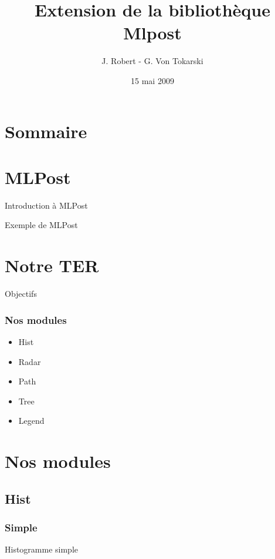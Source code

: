 \documentclass{beamer}
\title{Extension de la bibliothèque Mlpost}
\author{J. Robert - G. Von Tokarski}
\date{15 mai 2009}
\begin{document}
\begin{frame}
  \maketitle
\end{frame}

\section*{Sommaire}
\begin{frame}
  \tableofcontents
\end{frame}

\section{MLPost}
\begin{frame}{Introduction à MLPost}
\end{frame}

\begin{frame}{Exemple de MLPost}
\end{frame}

\section{Notre TER}
\begin{frame}{Objectifs}
\end{frame}

\begin{frame}
  \frametitle{Nos modules}
  \begin{itemize}
    \item<1-> Hist
    \item<2-> Radar
    \item<3-> Path
    \item<4-> Tree
    \item<5-> Legend
  \end{itemize}
\end{frame}

\section{Nos modules}
\subsection{Hist}
\subsubsection{Simple}
\begin{frame}{Histogramme simple}
  
\end{frame}
\end{document}
